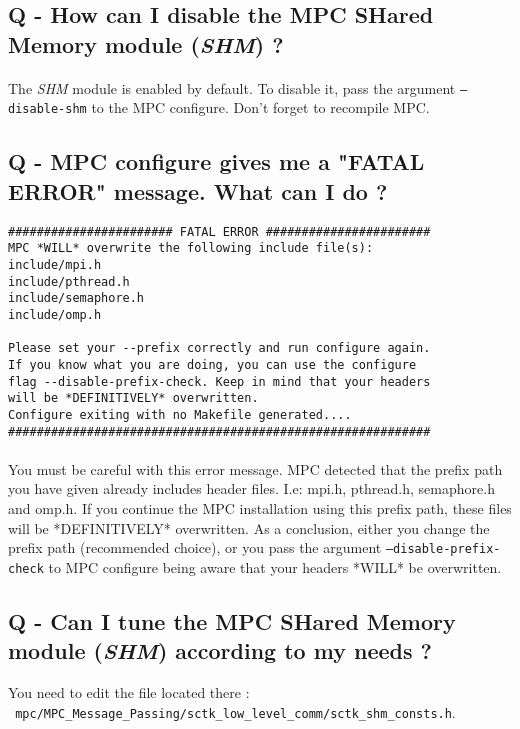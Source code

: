 \documentclass[a4paper,11pt]{article}
\begin{document}
\subsection*{Q - How can I disable the MPC SHared Memory module (\emph{SHM}) ?}
\paragraph{}
The \emph{SHM} module is enabled by default. To disable it, pass the argument
{\tt--disable-shm} to the MPC configure. Don't forget to recompile MPC.

\subsection*{Q - MPC configure gives me a "FATAL ERROR" message. What can I do ?}
\begin{lstlisting}
####################### FATAL ERROR #######################
MPC *WILL* overwrite the following include file(s):
include/mpi.h
include/pthread.h
include/semaphore.h
include/omp.h

Please set your --prefix correctly and run configure again.
If you know what you are doing, you can use the configure
flag --disable-prefix-check. Keep in mind that your headers
will be *DEFINITIVELY* overwritten.
Configure exiting with no Makefile generated....
###########################################################
\end{lstlisting}
\paragraph{}
You must be careful with this error message. MPC detected that the prefix path
you have given already includes header files. I.e: mpi.h, pthread.h, semaphore.h
and omp.h.
If you continue the MPC installation using this prefix path, these files will be *DEFINITIVELY* overwritten.
As a conclusion, either you change the prefix path (recommended choice), or you
pass the argument {\tt --disable-prefix-check} to MPC configure being aware that
your headers *WILL* be overwritten.

\subsection*{Q - Can I tune the MPC SHared Memory module (\emph{SHM}) according
to my needs ?}
You need to edit the file located there : \\{\tt
mpc/MPC\_Message\_Passing/sctk\_low\_level\_comm/sctk\_shm\_consts.h}.
\end{document}

